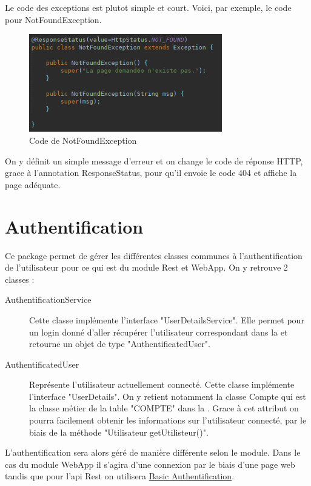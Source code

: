 		Le code des exceptions est plutot simple et court. Voici, par exemple, le code pour NotFoundException.

		\begin{figure}[H]
			\centering\includegraphics[width=0.75\textwidth, keepaspectratio]{res/NotFoundException.png}
			\caption{Code de NotFoundException}
		\end{figure}

		On y définit un simple message d'erreur et on change le code de réponse HTTP, grace à l'annotation ResponseStatus, pour qu'il envoie le code 404 et affiche la page adéquate.

	\section{Authentification}
		\label{sec:core_authentification}

		Ce package permet de gérer les différentes classes communes à l'authentification de l'utilisateur pour ce qui est du module Rest et WebApp. On y retrouve 2 classes :

		\begin{description}
		   \item[AuthentificationService]{Cette classe implémente l'interface "UserDetailsService". Elle permet pour un login donné d'aller récupérer l'utilisateur correspondant dans la \bdd{} et retourne un objet de type "AuthentificatedUser".}
		   \item[AuthentificatedUser]{Représente l'utilisateur actuellement connecté. Cette classe implémente l'interface "UserDetails". On y retient notamment la classe Compte qui est la classe métier de la table "COMPTE" dans la \bdd{}. Grace à cet attribut on pourra facilement obtenir les informations sur l'utilisateur connecté, par le biais de la méthode "Utilisateur getUtilisteur()".}
	   \end{description}

	   L'authentification sera alors géré de manière différente selon le module. Dans le cas du module WebApp il s'agira d'une connexion par le biais d'une page web tandis que pour l'api Rest on utilisera \href{https://fr.wikipedia.org/wiki/Authentification\_HTTP#M%C3%A9thode\_%C2%AB\_Basic\_%C2%BB}{Basic Authentification}.

